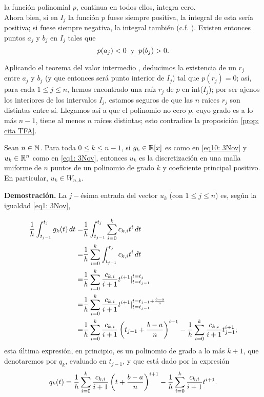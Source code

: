 \noindent la función polinomial $p$, continua en todos ellos, 
integra cero. \\

Ahora bien, si en $I_{j}$ la función $p$ fuese siempre
positiva, la integral de esta sería positiva; si fuese
siempre negativa, la integral también
(c.f. ). Existen entonces
puntos $a_{j}$ y $ b_{j}$ en $I_{j}$ tales que
\[
p(a_{j})<0 \hspace{0.2cm} \text{y}
\hspace{0.2cm} p(b_{j})>0.
\]

\noindent Aplicando el teorema del valor intermedio
, 
deducimos la existencia de un 
$r_{j}$ entre $a_{j}$ y 
$b_{j}$ (y que entonces será punto
interior de $I_{j}$) tal que $p(r_{j})=0$;
así, para cada $1 \leq j \leq n$,
hemos
encontrado una raíz $r_{j}$ de $p$ en int($I_{j}$);
por ser ajenos los interiores de los intervalos $I_{j}$,
estamos seguros de que las $n$ raices $r_{j}$ son distintas
entre sí.
Llegamos así
a que el polinomio no cero $p$, cuyo grado es a lo más $n-1$,
tiene al menos $n$ raíces distintas; esto
contradice la proposición \ref{prop: cita TFA}.
\QEDB
\vspace{0.2cm}

\begin{prop}
\label{prop: uk son discretizaciones pol...}
Sean $n \in \mathbb{N}$. Para toda $0 \leq k\leq n-1$, si
$g_{k} \in \mathbb{R}[x]$ es como en \eqref{eq10: 3Nov}
y $u_{k} \in \mathbb{R}^{n}$ como en
\eqref{eq1: 3Nov}, entonces
$u_{k}$ es la discretización en una malla uniforme
de $n$ puntos de un polinomio de grado $k$
y coeficiente principal positivo. En particular,
$u_{k} \in W_{n,k}$.
\end{prop}
\noindent
\textbf{Demostración.}
La $j-$ésima entrada del vector $u_{k}$
(con $1 \leq j \leq n$)
es, según la igualdad \eqref{eq1: 3Nov},

\begin{align} 
\frac{1}{h} \int_{t_{j-1}}^{t_{j}}{g_{k}(t)} \,dt = &
\frac{1}{h} \int_{t_{j-1}}^{t_{j}}{\suma{i=0}{k}{c_{k,i}t^{i}}} \,dt 
\nonumber \\
= & \frac{1}{h} \suma{i=0}{k}{\int_{t_{j-1}}^{t_{j}}{c_{k,i}t^{i}} \, dt}
\nonumber \\
= & \frac{1}{h} \suma{i=0}{k}{
\frac{c_{k,i}}{i+1}t^{i+1} | ^{t=t_{j}}_{t=t_{j-1}}
} 
\nonumber \\
= & \frac{1}{h} \suma{i=0}{k}{
\frac{c_{k,i}}{i+1}t^{i+1} | ^{t=t_{j-1}+\frac{b-a}{n}}_{t=t_{j-1}}} 
\nonumber \\
= & 
\frac{1}{h} \suma{i=0}{k}{
\frac{c_{k,i}}{i+1} \left( t_{j-1}+ \frac{b-a}{n} \right)^{i+1}}-
\frac{1}{h} \suma{i=0}{k}{
\frac{c_{k,i}}{i+1} t_{j-1}^{i+1}}; \nonumber\\
\end{align}
esta última expresión, en principio, es un polinomio
de grado a lo más $k+1$,
que denotaremos por $q_{k}$, evaluado en $t_{j-1}$,
y que está dado por la expresión
\begin{equation} \label{eq2: 5Nov}
q_{k}(t)= \frac{1}{h} \sum\limits_{i=0}^{k}
\frac{c_{k,i}}{i+1} \left(t+ \frac{b-a}{n} \right)^{i+1}-
\frac{1}{h} \sum\limits_{i=0}^{k}
\frac{c_{k,i}}{i+1} t^{i+1}.
\end{equation}

